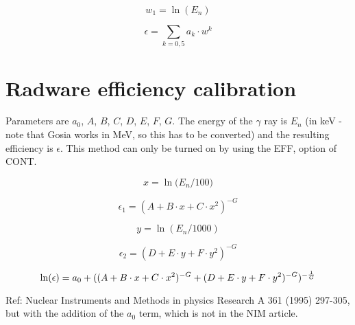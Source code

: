 \begin{equation}
w_1 = \ln(E_n)
\end{equation}

\begin{equation}
\epsilon = \sum_{k=0,5} a_k \cdot w^k
\end{equation}


\section{Radware efficiency calibration}

Parameters are $a_0$, $A$, $B$, $C$, $D$, $E$, $F$, $G$. The
energy of the $\gamma$ ray is $E_n$ (in keV - note that Gosia works in MeV,
so this has to be converted) and the resulting efficiency is $\epsilon$.
This method can only be turned on by using the EFF, option of CONT.

\begin{equation}
x = \ln\big({E_n/100}\big)
\end{equation}

\begin{equation}
\epsilon_1 = (A + B \cdot x + C \cdot x^2) ^{-G}
\end{equation}

\begin{equation}
y = \ln(E_n/1000)
\end{equation}

\begin{equation}
\epsilon_2 = (D + E \cdot y + F \cdot y^2)^{-G}
\end{equation}

\begin{equation}
\ln(\epsilon) = a_0 + ((A + B \cdot x + C \cdot x^2) ^{-G} +
(D + E \cdot y + F \cdot y^2)^{-G})^{-{1 \over G}}
\end{equation}

Ref: Nuclear Instruments and Methods in physics Research A 361 (1995)
297-305, but with the addition of the $a_0$ term, which is not in the NIM
article.
